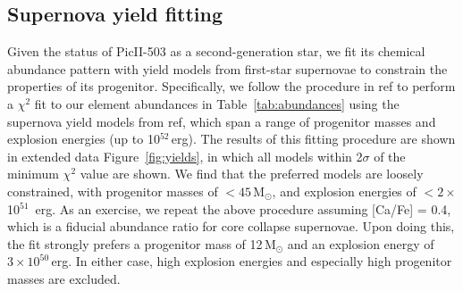 \documentclass[pdflatex,sn-nature]{sn-jnl}%
\theoremstyle{thmstyleone}%
\theoremstyle{thmstyletwo}%
\theoremstyle{thmstylethree}%
\begin{document}
\subsection*{Supernova yield fitting}

Given the status of PicII-503 as a second-generation star, we fit its chemical abundance pattern with yield models from first-star supernovae to constrain the properties of its progenitor. 
Specifically, we follow the procedure in ref\cite{jls+20} to perform a $\chi^2$ fit to our element abundances in Table~\ref{tab:abundances} using the supernova yield models from ref\cite{hw+10}, which span a range of progenitor masses and explosion energies (up to 10$^{52}$\,erg).
The results of this fitting procedure are shown in extended data Figure~\ref{fig:yields}, in which all models within 2$\sigma$ of the minimum $\chi^2$ value are shown.
We find that the preferred models are loosely constrained, with  progenitor masses of $<45$\,M$_\odot$, and explosion energies of  $< 2\times$10$^{51}$ \,erg.
As an exercise, we repeat the above procedure assuming [Ca/Fe] = 0.4, which is a fiducial abundance ratio for core collapse supernovae\cite{ww+95,fn+15}. 
Upon doing this, the fit strongly prefers a progenitor mass of 12\,M$_\odot$ and an explosion energy of $3\times10^{50}$\,erg.
In either case, high explosion energies and especially high progenitor masses are excluded.
\end{document}
